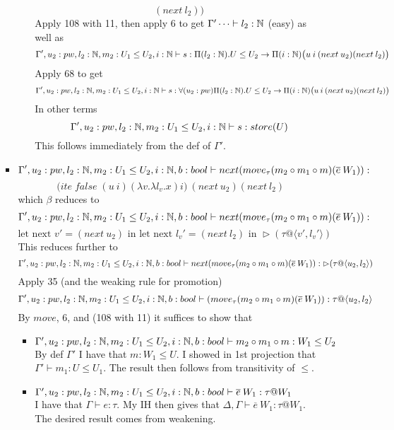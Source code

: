 \documentclass{article}
\begin{document}
\begin{itemize}
\begin{itemize}
\begin{itemize}
\begin{itemize}
\[(next \: l_2) \big)
\]
Apply 108 with 11, then apply 6 to get $\Gamma' \dots \vdash l_2: \mathbb{N}$ (easy) as well as 
\[\Gamma', u_2: pw, l_2: \mathbb{N}, m_2:U_1 \leq U_2, i : \mathbb{N} \vdash s : \Pi(l_2: \mathbb{N}).U \leq U_2 \rightarrow \Pi(i: \mathbb{N})\big(u \: i \: (next \: u_2)
(next \: l_2) \big)
\]
Apply 68 to get
\[\Gamma', u_2: pw, l_2: \mathbb{N}, m_2:U_1 \leq U_2, i : \mathbb{N} \vdash s : \forall(u_2: pw)\Pi(l_2: \mathbb{N}).U \leq U_2 \rightarrow \Pi(i: \mathbb{N})\big(u \: i \: (next \: u_2)
(next \: l_2) \big)
\]
In other terms 
\[\Gamma', u_2: pw, l_2: \mathbb{N}, m_2:U_1 \leq U_2, i : \mathbb{N} \vdash s : store(U)
\]
This follows immediately from the def of $\Gamma'$.
\end{itemize}
\item 
\[\Gamma', u_2: pw, l_2: \mathbb{N}, m_2:U_1 \leq U_2, i : \mathbb{N}, b: bool  \vdash  next
(move_{\tau}(m_2 \circ m_1 \circ m) 
(\overline{e}\: W_1)) :\]
\[ \Big( ite \; false \; (u\:i)(\lambda v. \lambda l_v. x) i \Big) \: (next \: u_2)
(next \: l_2)
\]
which $\beta$ reduces to 
\[\Gamma', u_2: pw, l_2: \mathbb{N}, m_2:U_1 \leq U_2, i : \mathbb{N}, b: bool  \vdash  next
(move_{\tau}(m_2 \circ m_1 \circ m) 
(\overline{e}\: W_1)) :\]
\[\text{let next }v' = (next \: u_2) \text{ in let next } l_v' = (next \: l_2) \text{ in } \rhd(\tau @ \langle v', l_v' \rangle)\]
This reduces further to
\[\Gamma', u_2: pw, l_2: \mathbb{N}, m_2:U_1 \leq U_2, i : \mathbb{N}, b: bool  \vdash  next
(move_{\tau}(m_2 \circ m_1 \circ m) 
(\overline{e}\: W_1)) : \rhd(\tau @ \langle u_2, l_2 \rangle)\]
Apply 35 (and the weaking rule for promotion)
\[\Gamma', u_2: pw, l_2: \mathbb{N}, m_2:U_1 \leq U_2, i : \mathbb{N}, b: bool  \vdash 
(move_{\tau}(m_2 \circ m_1 \circ m) 
(\overline{e}\: W_1)) : \tau @ \langle u_2, l_2 \rangle\]
By $move$, 6, and (108 with 11) it suffices to show that
\begin{itemize}
    \item $\Gamma', u_2: pw, l_2: \mathbb{N}, m_2:U_1 \leq U_2, i : \mathbb{N}, b: bool  \vdash m_2 \circ m_1 \circ m: W_1 \leq U_2$\\
    By def $\Gamma'$ I have that $m : W_1 \leq U$. I showed in 1st projection that $\Gamma' \vdash m_1 : U \leq U_1$. The result then follows from transitivity of $\leq$.
    \item $\Gamma', u_2: pw, l_2: \mathbb{N}, m_2:U_1 \leq U_2, i : \mathbb{N}, b: bool  \vdash \overline{e}\: W_1 : \tau @ W_1$\\
    I have that $\Gamma \vdash e: \tau$. My IH then gives that $\Delta, \Gamma \vdash \overline{e}\: W_1 : \tau @ W_1$. The desired result comes from weakening.
\end{itemize}
\end{itemize}

\end{itemize}
\end{itemize}
\end{document}
